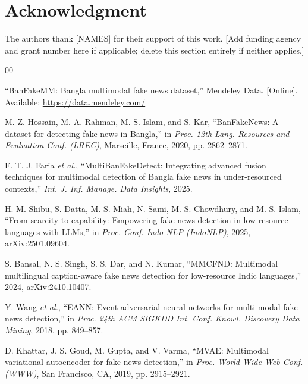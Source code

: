 \documentclass[conference,a4paper]{IEEEtran}
\newif\ifdraftnotes
\begin{document}
\section*{Acknowledgment}
The authors thank [NAMES] for their support of this work. [Add funding
agency and grant number here if applicable; delete this section entirely if
neither applies.]
\fi

\begin{thebibliography}{00}

 ``BanFakeMM: Bangla multimodal fake news dataset,''
Mendeley Data. [Online]. Available: \url{https://data.mendeley.com/}
\ifdraftnotes\\\emph{\footnotesize [DRAFT NOTE -- REMOVE BEFORE SUBMISSION]
Dataset citation incomplete: no DOI, curator name, or year could be
independently verified; the exact Mendeley record must be supplied.}\fi

 M. Z. Hossain, M. A. Rahman, M. S. Islam, and S. Kar,
``BanFakeNews: A dataset for detecting fake news in Bangla,'' in
\emph{Proc. 12th Lang. Resources and Evaluation Conf. (LREC)}, Marseille,
France, 2020, pp. 2862--2871.

 F. T. J. Faria \emph{et al.},
``MultiBanFakeDetect: Integrating advanced fusion techniques for multimodal
detection of Bangla fake news in under-resourced contexts,''
\emph{Int. J. Inf. Manage. Data Insights}, 2025.

 H. M. Shibu, S. Datta, M. S. Miah, N. Sami,
M. S. Chowdhury, and M. S. Islam, ``From scarcity to capability: Empowering
fake news detection in low-resource languages with LLMs,'' in
\emph{Proc. Conf. Indo NLP (IndoNLP)}, 2025, arXiv:2501.09604.

 S. Bansal, N. S. Singh, S. S. Dar, and N. Kumar,
``MMCFND: Multimodal multilingual caption-aware fake news detection for
low-resource Indic languages,'' 2024, arXiv:2410.10407.

 Y. Wang \emph{et al.}, ``EANN: Event adversarial neural
networks for multi-modal fake news detection,'' in \emph{Proc. 24th ACM
SIGKDD Int. Conf. Knowl. Discovery Data Mining}, 2018, pp. 849--857.

 D. Khattar, J. S. Goud, M. Gupta, and V. Varma,
``MVAE: Multimodal variational autoencoder for fake news detection,'' in
\emph{Proc. World Wide Web Conf. (WWW)}, San Francisco, CA, 2019,
pp. 2915--2921.


\end{thebibliography}
\end{document}
